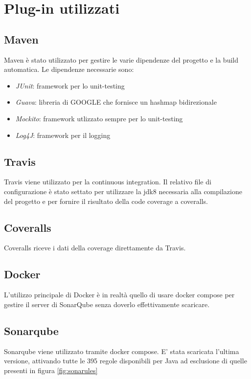 \chapter{Plug-in utilizzati}
	\section{Maven}
		Maven è stato utilizzato per gestire le varie dipendenze del progetto e la build automatica.
		Le dipendenze necessarie sono: 
		\begin{itemize}
			\item \emph{JUnit}: framework per lo unit-testing
			\item \emph{Guava}: libreria di GOOGLE che fornisce un hashmap bidirezionale
			\item \emph{Mockito}: framework utlizzato sempre per lo unit-testing
			\item \emph{Log4J}: framework per il logging 
		\end{itemize}
		
	\section{Travis}
		Travis viene utilizzato per la continuous integration. Il relativo file di configurazione è stato settato per utilizzare la jdk8 necessaria alla compilazione del progetto e per fornire il risultato della code coverage a coveralls.
		
	\section{Coveralls}
		Coveralls riceve i dati della coverage direttamente da Travis.
		
	\section{Docker}
		L'utilizzo principale di Docker è in realtà quello di usare docker compose per gestire il server di SonarQube senza doverlo effettivamente scaricare. 
		
	\section{Sonarqube}
		Sonarqube viene utilizzato tramite docker compose. E' stata scaricata l'ultima versione, attivando tutte le 395 regole disponibili per Java ad esclusione di quelle presenti in figura \ref{fig:sonarules}
		
